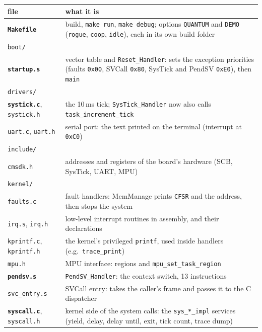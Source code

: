 \begin{center}
    \small
    \begin{tabular}{l p{11.2cm}}
        \hline
        \textbf{file} & \textbf{what it is} \\
        \hline
        \textbf{\texttt{Makefile}} & build, \texttt{make run}, \texttt{make debug}; options \texttt{QUANTUM} and \texttt{DEMO} (\texttt{rogue}, \texttt{coop}, \texttt{idle}), each in its own build folder \\
        \hline
        \multicolumn{2}{l}{\texttt{boot/}} \\
        \textbf{\texttt{startup.s}} & vector table and \texttt{Reset\_Handler}: sets the exception priorities (faults \texttt{0x00}, SVCall \texttt{0x80}, SysTick and PendSV \texttt{0xE0}), then \texttt{main} \\
        \hline
        \multicolumn{2}{l}{\texttt{drivers/}} \\
        \textbf{\texttt{systick.c}}, \texttt{systick.h} & the 10\,ms tick; \texttt{SysTick\_Handler} now also calls \texttt{task\_increment\_tick} \\
        \texttt{uart.c}, \texttt{uart.h} & serial port: the text printed on the terminal (interrupt at \texttt{0xC0}) \\
        \hline
        \multicolumn{2}{l}{\texttt{include/}} \\
        \texttt{cmsdk.h} & addresses and registers of the board's hardware (SCB, SysTick, UART, MPU) \\
        \hline
        \multicolumn{2}{l}{\texttt{kernel/}} \\
        \texttt{faults.c} & fault handlers: MemManage prints \texttt{CFSR} and the address, then stops the system \\
        \texttt{irq.s}, \texttt{irq.h} & low-level interrupt routines in assembly, and their declarations \\
        \texttt{kprintf.c}, \texttt{kprintf.h} & the kernel's privileged \texttt{printf}, used inside handlers (e.g.\ \texttt{trace\_print}) \\
        \texttt{mpu.h} & MPU interface: regions and \texttt{mpu\_set\_task\_region} \\
        \textbf{\texttt{pendsv.s}} & \texttt{PendSV\_Handler}: the context switch, 13 instructions \\
        \texttt{svc\_entry.s} & SVCall entry: takes the caller's frame and passes it to the C dispatcher \\
        \textbf{\texttt{syscall.c}}, \texttt{syscall.h} & kernel side of the system calls: the \texttt{sys\_*\_impl} services (yield, delay, delay until, exit, tick count, trace dump) \\

\end{tabular}
\end{center}
